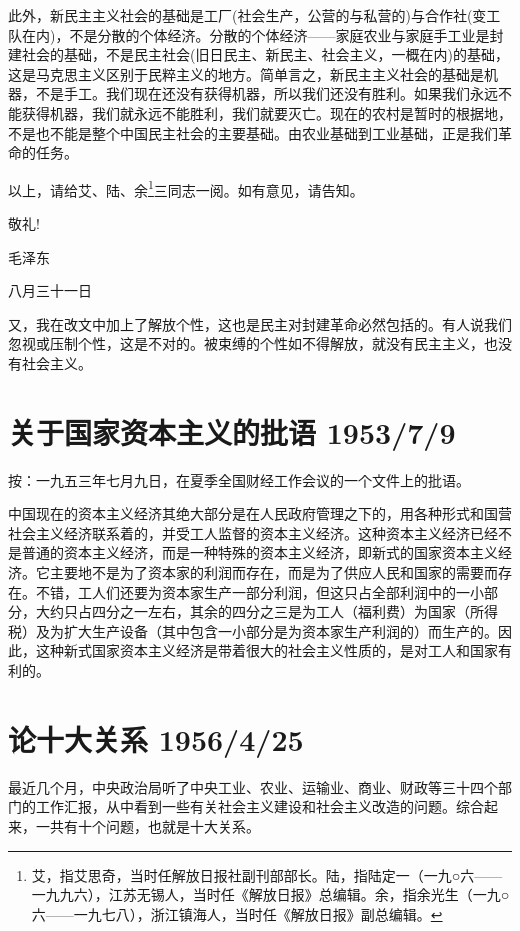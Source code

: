 \documentclass[UTF8, 12pt, a4paper]{ctexrep}
\begin{document}
此外，新民主主义社会的基础是工厂(社会生产，公营的与私营的)与合作社(变工队在内)，不是分散的个体经济。分散的个体经济——家庭农业与家庭手工业是封建社会的基础，不是民主社会(旧日民主、新民主、社会主义，一概在内)的基础，这是马克思主义区别于民粹主义的地方。简单言之，新民主主义社会的基础是机器，不是手工。我们现在还没有获得机器，所以我们还没有胜利。如果我们永远不能获得机器，我们就永远不能胜利，我们就要灭亡。现在的农村是暂时的根据地，不是也不能是整个中国民主社会的主要基础。由农业基础到工业基础，正是我们革命的任务。

以上，请给艾、陆、余\footnote{艾，指艾思奇，当时任解放日报社副刊部部长。陆，指陆定一（一九○六——一九九六），江苏无锡人，当时任《解放日报》总编辑。余，指余光生（一九○六——一九七八），浙江镇海人，当时任《解放日报》副总编辑。}三同志一阅。如有意见，请告知。

敬礼!

毛泽东

八月三十一日

又，我在改文中加上了解放个性，这也是民主对封建革命必然包括的。有人说我们忽视或压制个性，这是不对的。被束缚的个性如不得解放，就没有民主主义，也没有社会主义。

\section{关于国家资本主义的批语 1953/7/9}

按：一九五三年七月九日，在夏季全国财经工作会议的一个文件上的批语。

中国现在的资本主义经济其绝大部分是在人民政府管理之下的，用各种形式和国营社会主义经济联系着的，并受工人监督的资本主义经济。这种资本主义经济已经不是普通的资本主义经济，而是一种特殊的资本主义经济，即新式的国家资本主义经济。它主要地不是为了资本家的利润而存在，而是为了供应人民和国家的需要而存在。不错，工人们还要为资本家生产一部分利润，但这只占全部利润中的一小部分，大约只占四分之一左右，其余的四分之三是为工人（福利费）为国家（所得税）及为扩大生产设备（其中包含一小部分是为资本家生产利润的）而生产的。因此，这种新式国家资本主义经济是带着很大的社会主义性质的，是对工人和国家有利的。

\section{论十大关系 1956/4/25}

最近几个月，中央政治局听了中央工业、农业、运输业、商业、财政等三十四个部门的工作汇报，从中看到一些有关社会主义建设和社会主义改造的问题。综合起来，一共有十个问题，也就是十大关系。
\end{document}

